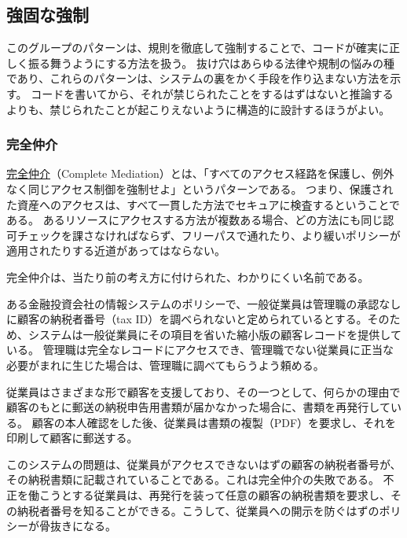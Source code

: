 \documentclass[uplatex]{jsarticle}
\def\label#1{}%
\begin{document}
\subsection{強固な強制}

このグループのパターンは、規則を徹底して強制することで、コードが確実に正しく振る舞うようにする方法を扱う。
抜け穴はあらゆる法律や規制の悩みの種であり、これらのパターンは、システムの裏をかく手段を作り込まない方法を示す。
コードを書いてから、それが禁じられたことをするはずはないと推論するよりも、禁じられたことが起こりえないように構造的に設計するほうがよい。

\subsubsection{完全仲介}

\begin{dfn}[完全仲介]\label{dfn:ch4-complete-mediation}
\underline{完全仲介}（Complete Mediation）とは、「すべてのアクセス経路を保護し、例外なく同じアクセス制御を強制せよ」というパターンである。
つまり、保護された資産へのアクセスは、すべて一貫した方法でセキュアに検査するということである。
あるリソースにアクセスする方法が複数ある場合、どの方法にも同じ認可チェックを課さなければならず、フリーパスで通れたり、より緩いポリシーが適用されたりする近道があってはならない。
\end{dfn}

完全仲介は、当たり前の考え方に付けられた、わかりにくい名前である。

\begin{exa}[投資会社の納税者番号]\label{exa:ch4-tax-id}
ある金融投資会社の情報システムのポリシーで、一般従業員は管理職の承認なしに顧客の納税者番号（tax ID）を調べられないと定められているとする。そのため、システムは一般従業員にその項目を省いた縮小版の顧客レコードを提供している。
管理職は完全なレコードにアクセスでき、管理職でない従業員に正当な必要がまれに生じた場合は、管理職に調べてもらうよう頼める。

従業員はさまざまな形で顧客を支援しており、その一つとして、何らかの理由で顧客のもとに郵送の納税申告用書類が届かなかった場合に、書類を再発行している。
顧客の本人確認をした後、従業員は書類の複製（PDF）を要求し、それを印刷して顧客に郵送する。

このシステムの問題は、従業員がアクセスできないはずの顧客の納税者番号が、その納税書類に記載されていることである。これは完全仲介の失敗である。
不正を働こうとする従業員は、再発行を装って任意の顧客の納税書類を要求し、その納税者番号を知ることができる。こうして、従業員への開示を防ぐはずのポリシーが骨抜きになる。
\end{exa}
\end{document}
